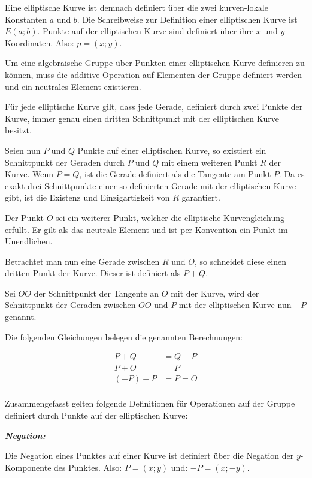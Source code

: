 Eine elliptische Kurve ist demnach definiert über die zwei kurven-lokale Konstanten $a$ und $b$.
Die Schreibweise zur Definition einer elliptischen Kurve ist $E(a;b)$.
Punkte auf der elliptischen Kurve sind definiert über ihre $x$ und $y$-Koordinaten. Also: $p = (x;y)$.

Um eine algebraische Gruppe über Punkten einer elliptischen Kurve definieren zu können, muss die additive
Operation auf Elementen der Gruppe definiert werden und ein neutrales Element existieren.

Für jede elliptische Kurve gilt, dass jede Gerade, definiert durch zwei Punkte der Kurve, immer genau einen
dritten Schnittpunkt mit der elliptischen Kurve besitzt.

Seien nun $P$ und $Q$ Punkte auf einer elliptischen Kurve, so existiert ein Schnittpunkt der Geraden durch $P$
und $Q$ mit einem weiteren Punkt $R$ der Kurve. Wenn $P = Q$, ist die Gerade definiert als die Tangente am
Punkt $P$. Da es exakt drei Schnittpunkte einer so definierten Gerade mit der elliptischen Kurve gibt, 
ist die Existenz und Einzigartigkeit von $R$ garantiert.

Der Punkt $O$ sei ein weiterer Punkt, welcher die elliptische Kurvengleichung erfüllt. Er gilt als das neutrale
Element und ist per Konvention ein Punkt im Unendlichen.

Betrachtet man nun eine Gerade zwischen $R$ und $O$, so schneidet diese einen dritten Punkt der Kurve. 
Dieser ist definiert als $P + Q$.

Sei $OO$ der Schnittpunkt der Tangente an $O$ mit der Kurve, wird der Schnittpunkt der Geraden zwischen $OO$ und $P$ mit der elliptischen Kurve nun $-P$ genannt.\cite{explicit_addition}

Die folgenden Gleichungen belegen die genannten Berechnungen:

\begin{align*}
P + Q    &= Q + P \\
P + O    &= P \\
(-P) + P &= P = O \\
\end{align*}

Zusammengefasst gelten folgende Definitionen für Operationen auf der Gruppe definiert durch Punkte auf der 
elliptischen Kurve:

\newpage

\textit{\textbf{Negation:}}

Die Negation eines Punktes auf einer Kurve ist definiert über die Negation der $y$-Komponente des Punktes.
Also: $P = (x;y)$ und: $-P = (x;-y)$.

